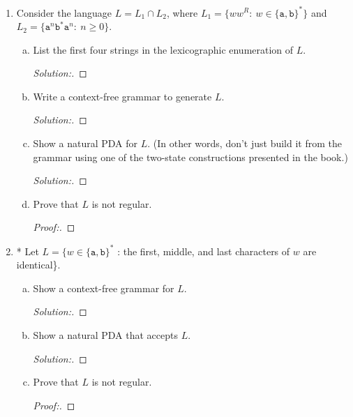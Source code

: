 \documentclass[10pt]{article}
\begin{document}
\begin{enumerate}[1)]

\item
Consider the language $L = L_1 \cap L_2$, where $L_1 = \{ww^R:\ w \in \{\texttt{a}, \texttt{b}\}^*\}$ and $L_2 = \{\texttt{a}^n\texttt{b}^*\texttt{a}^n:\ n \geq 0\}$.
\begin{enumerate}[a)]
\item
List the first four strings in the lexicographic enumeration of $L$.
\begin{proof}[Solution:]
\end{proof}

\item
Write a context-free grammar to generate $L$.
\begin{proof}[Solution:]
\end{proof}

\item
Show a natural PDA for $L$.  (In other words, don’t just build it from the grammar using one of the two-state constructions presented in the book.)
\begin{proof}[Solution:]
\end{proof}

\item
Prove that $L$ is not regular.
\begin{proof}[Proof:]
\end{proof}
\end{enumerate}



\item
* Let $L = \{w \in \{\texttt{a}, \texttt{b}\}^*$ : the first, middle, and last characters of $w$ are identical\}.
\begin{enumerate}[a)]
\item
Show a context-free grammar for $L$.
\begin{proof}[Solution:]
\end{proof}

\item
Show a natural PDA that accepts $L$.
\begin{proof}[Solution:]
\end{proof}

\item
Prove that $L$ is not regular.
\begin{proof}[Proof:]
\end{proof}
\end{enumerate}
\end{enumerate}
\end{document}
